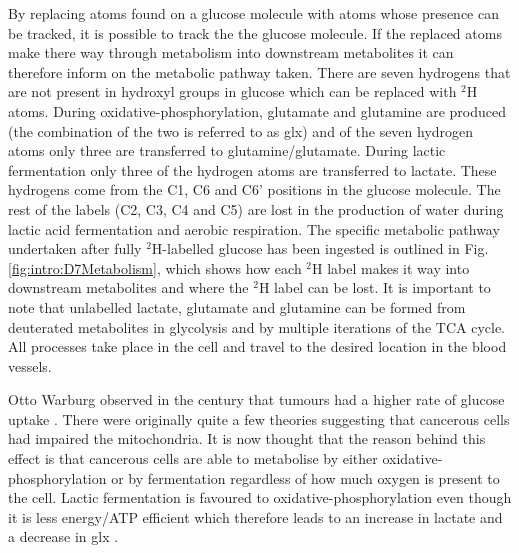 By replacing atoms found on a glucose molecule with atoms whose presence can be tracked, it is possible to track the the glucose molecule. If the replaced atoms make there way through metabolism into downstream metabolites it can therefore inform on the metabolic pathway taken. There are seven hydrogens that are not present in hydroxyl groups in glucose which can be replaced with $^2$H atoms. During oxidative-phosphorylation, glutamate and glutamine are produced (the combination of the two is referred to as glx) and of the seven hydrogen atoms only three are transferred to glutamine/glutamate. During lactic fermentation only three of the hydrogen atoms are transferred to lactate. These hydrogens come from the C1, C6 and C6' positions in the glucose molecule. The rest of the labels (C2, C3, C4 and C5) are lost in the production of water during lactic acid fermentation and aerobic respiration. The specific metabolic pathway undertaken after fully $^2$H-labelled glucose has been ingested is outlined in Fig. \ref{fig:intro:D7Metabolism}, which shows how each $^2$H label makes it way into downstream metabolites and where the $^2$H label can be lost. It is important to note that unlabelled lactate, glutamate and glutamine can be formed from deuterated metabolites in glycolysis and by multiple iterations of the \ac{TCA} cycle. All processes take place in the cell and travel to the desired location in the blood vessels.

Otto Warburg observed in the  century that tumours had a higher rate of glucose uptake \cite{WarburgBerlin-Dahlem1925TheCells,Warburg1956OnCells}. There were originally quite a few theories suggesting that cancerous cells had impaired the mitochondria. It is now thought that the reason behind this effect is that cancerous cells are able to metabolise by either oxidative-phosphorylation or by fermentation regardless of how much oxygen is present to the cell. Lactic fermentation is favoured to oxidative-phosphorylation even though it is less energy/\ac{ATP} efficient which therefore leads to an increase in lactate and a decrease in glx \cite{Romero-Garcia2011TumorView}.

